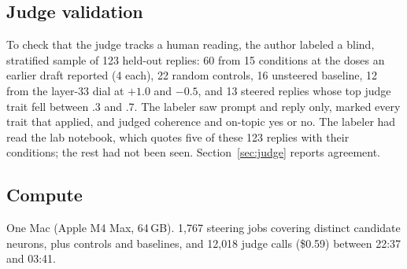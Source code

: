 \subsection{Judge validation}\label{sec:valmethod}
To check that the judge tracks a human reading, the author labeled a blind, stratified sample of 123 held-out
replies: 60 from 15 conditions at the doses an earlier draft reported (4 each), 22 random controls, 16
unsteered baseline, 12 from the layer-33 dial at $+1.0$ and $-0.5$, and 13 steered replies whose top judge
trait fell between .3 and .7. The labeler saw prompt and reply only, marked every trait that applied, and
judged coherence and on-topic yes or no. The labeler had read the lab notebook, which quotes five of these
123 replies with their conditions; the rest had not been seen. Section~\ref{sec:judge} reports agreement.

\subsection{Compute}
One Mac (Apple M4 Max, 64\,GB). 1{,}767 steering jobs covering \nScreened{} distinct candidate neurons, plus
controls and baselines, and 12{,}018 judge calls (\$0.59) between 22:37 and 03:41.
